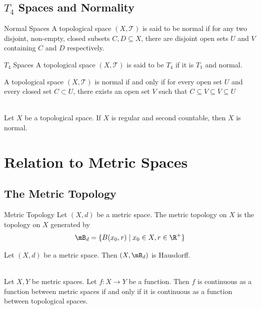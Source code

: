 \documentclass[a4paper]{article}
\begin{document}
\subsection{$T_4$ Spaces and Normality}
\begin{defn}{Normal Spaces}{} A topological space $(X,\mathcal{T})$ is said to be normal if for any two disjoint, non-empty, closed subsets $C,D\subseteq X$, there are disjoint open sets $U$ and $V$ containing $C$ and $D$ respectively. 
\end{defn}

\begin{defn}{$T_4$ Spaces}{} A topological space $(X,\mathcal{T})$ is said to be $T_4$ if it is $T_1$ and normal. 
\end{defn}

\begin{prp}{}{}  A topological space $(X,\mathcal{T})$ is normal if and only if for every open set $U$ and every closed set $C\subset U$, there exists an open set $V$ such that $C\subseteq V\subseteq\overline{V}\subseteq U$
\end{prp}

\begin{prp}{}{}\\
Let $X$ be a topological space. If $X$ is regular and second countable, then $X$ is normal. 
\end{prp}

\pagebreak
\section{Relation to Metric Spaces}
\subsection{The Metric Topology}
\begin{defn}{Metric Topology}{} Let $(X,d)$ be a metric space. The metric topology on $X$ is the topology on $X$ generated by $$\mB_d=\{B(x_0,r)\;|\;x_0\in X,r\in\R^+\}$$
\end{defn}

\begin{prp}{}{} Let $(X,d)$ be a metric space. Then $(X,\mB_d)$ is Hausdorff. 
\end{prp}

\begin{prp}{}{}\\
Let $X,Y$ be metric spaces. Let $f:X\to Y$ be a function. Then $f$ is continuous as a function between metric spaces if and only if it is continuous as a function between topological spaces. 
\end{prp}
\end{document}
